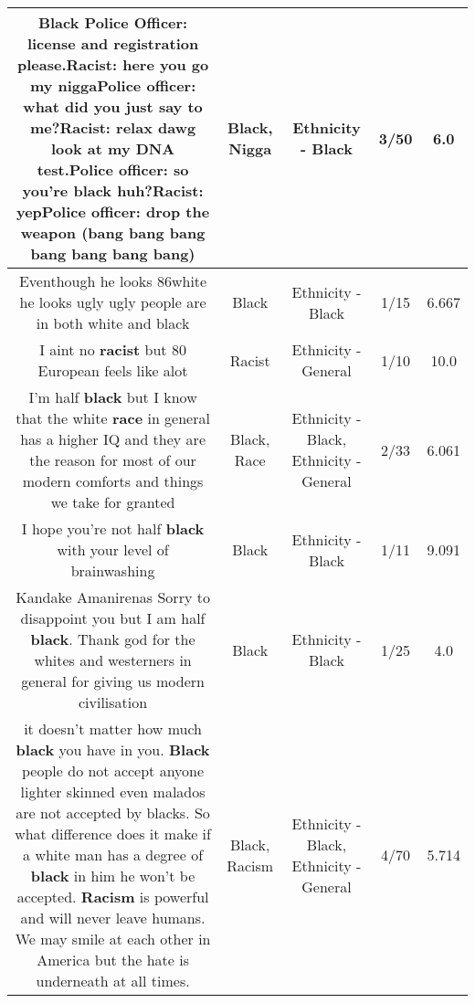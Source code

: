 \documentclass[11pt]{article}
\newlength\mylength
\begin{document}
\begin{center}
\begin{longtable}{|C{.65\mylength}|C{.30\mylength}|C{.12\mylength}|C{.12\mylength}|C{.12\mylength}|}
  \small Black Police Officer: license and registration please.Racist: here you go my \textbf{nigga}Police officer: what did you just say to me?Racist: relax dawg look at my DNA test.Police officer: so you're \textbf{black} huh?Racist: yepPolice officer: drop the weapon (bang bang bang bang bang bang bang)\normalsize   & Black, Nigga & Ethnicity - Black & 3/50 & 6.0 \\  \hline
  \small Eventhough he looks 86white he looks ugly ugly people are in both white and black\normalsize   & Black & Ethnicity - Black & 1/15 & 6.667 \\  \hline
  \small I aint no \textbf{racist} but 80 European feels like alot\normalsize   & Racist & Ethnicity - General & 1/10 & 10.0 \\  \hline
  \small I'm half \textbf{black} but I know that the white \textbf{race} in general has a higher IQ and they are the reason for most of our modern comforts and things we take for granted\normalsize   & Black, Race & Ethnicity - Black, Ethnicity - General & 2/33 & 6.061 \\  \hline
  \small I hope you're not half \textbf{black} with your level of brainwashing\normalsize   & Black & Ethnicity - Black & 1/11 & 9.091 \\  \hline
  \small Kandake Amanirenas Sorry to disappoint you but I am half \textbf{black}. Thank god for the whites and westerners in general for giving us modern civilisation\normalsize   & Black & Ethnicity - Black & 1/25 & 4.0 \\  \hline
  \small it doesn't matter how much \textbf{black} you have in you. \textbf{Black} people do not accept anyone lighter skinned even malados are not accepted by blacks. So what difference does it make if a white man has a degree of \textbf{black} in him he won't be accepted. \textbf{Racism} is powerful and will never leave humans. We may smile at each other in America but the hate is underneath at all times.\normalsize   & Black, Racism & Ethnicity - Black, Ethnicity - General & 4/70 & 5.714 \\  \hline

\end{longtable}
\end{center}
\end{document}
